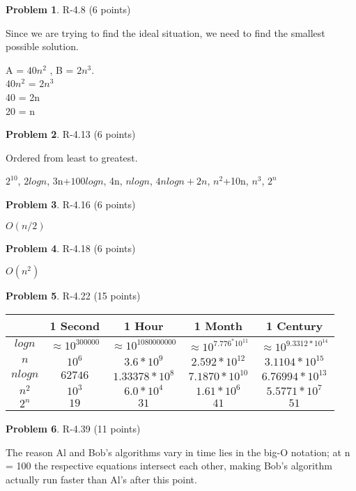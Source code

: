 \documentclass[12pt]{report}
\theoremstyle{definition}
\newtheorem{problem}{Problem}
\begin{document}
\begin{problem} 	R-4.8 (6 points) 		
\end{problem}
				Since we are trying to find the ideal situation, we need to find the smallest possible 						solution. 
\begin{center}
				A = $40n^2$ , B = $2n^3$. \\
				$40n^2$ = $2n^3$ \\
				40 = 2n \\
				20 = n
\end{center}

\begin{problem} 	R-4.13 (6 points)		
\end{problem}
				Ordered from least to greatest.
\begin{center}				
				$2^{10}$, $2logn$, 3n+$100logn$, 4n, $nlogn$, $4nlogn+2n$, $n^2$+10n, $n^3$, $2^n$
\end{center}

\begin{problem} 	R-4.16 (6 points)		
\end{problem}
\begin{center}		$O(n/2)$
\end{center}
				
\begin{problem} 	R-4.18 (6 points)		
\end{problem}

\begin{center}		$O(n^2)$
\end{center}

\begin{problem} 	R-4.22 (15 points)		
\end{problem}


\begin{center}
  \begin{tabular}{|c|c|c|c|c|}
    \hline
     & 1 Second & 1 Hour & 1 Month & 1 Century \\ \hline
    $logn$ & $\approx10^{300000}$ & $\approx10^{1080000000}$ & $\approx10^{7.776^*10^{11}}$ & $				\approx10^{9.3312*10^{14}}$\\ \hline
    $n$ & $10^6$ & $3.6*10^9$ & $2.592 * 10^{12}$ & $3.1104 * 10^{15}$ \\ \hline
    $nlogn$ & $62746 $ & $1.33378 * 10^8 $ & $7.1870 * 10^{10}$ & $6.76994 * 10^{13}$ \\ \hline
    $n^2$ & $10^3$ & $6.0 * 10^4$ & $1.61 * 10^6$ & $5.5771 * 10^7$ \\ \hline
    $2^n$ & $19$ & $31$ & $41$ & $51$ \\ \hline
    
    
  \end{tabular}
\end{center}

\begin{problem} 	R-4.39 (11 points)		
\end{problem}
				The reason Al and Bob's algorithms vary in time lies in the big-O notation; at n = 100 the 					respective equations intersect each other, making Bob's algorithm actually run faster than 				Al's after this point. 
\goodbreak
\end{document}
